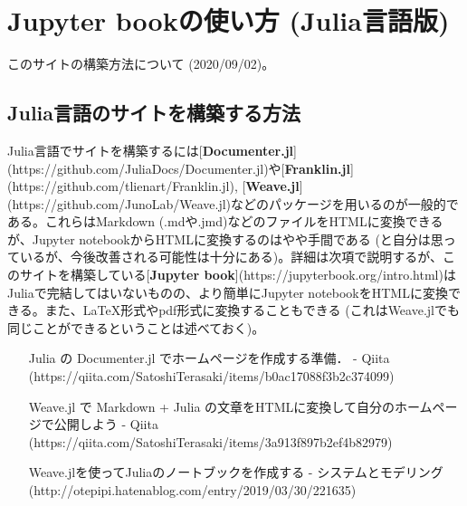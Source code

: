 \section{Jupyter bookの使い方 (Julia言語版)
}
このサイトの構築方法について (2020/09/02)。
\subsection{Julia言語のサイトを構築する方法
}
Julia言語でサイトを構築するには[\textbf{Documenter.jl}](https://github.com/JuliaDocs/Documenter.jl)や[\textbf{Franklin.jl}](https://github.com/tlienart/Franklin.jl), [\textbf{Weave.jl}](https://github.com/JunoLab/Weave.jl)などのパッケージを用いるのが一般的である。これらはMarkdown (.mdや.jmd)などのファイルをHTMLに変換できるが、Jupyter notebookからHTMLに変換するのはやや手間である (と自分は思っているが、今後改善される可能性は十分にある)。詳細は次項で説明するが、このサイトを構築している[\textbf{Jupyter book}](https://jupyterbook.org/intro.html)はJuliaで完結してはいないものの、より簡単にJupyter notebookをHTMLに変換できる。また、LaTeX形式やpdf形式に変換することもできる (これはWeave.jlでも同じことができるということは述べておく)。
\begin{itemize}
\item [Julia の Documenter.jl でホームページを作成する準備． - Qiita](https://qiita.com/SatoshiTerasaki/items/b0ac17088f3b2c374099)
\item [Weave.jl で Markdown + Julia の文章をHTMLに変換して自分のホームページで公開しよう - Qiita](https://qiita.com/SatoshiTerasaki/items/3a913f897b2ef4b82979)
\item [Weave.jlを使ってJuliaのノートブックを作成する - システムとモデリング](http://otepipi.hatenablog.com/entry/2019/03/30/221635)
\end{itemize}
